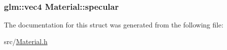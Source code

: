 \subsubsection[{\texorpdfstring{specular}{specular}}]{\setlength{\rightskip}{0pt plus 5cm}glm\+::vec4 Material\+::specular}\hypertarget{struct_material_ac891eeb20e11ff60f412484011d051b2}{}\label{struct_material_ac891eeb20e11ff60f412484011d051b2}


The documentation for this struct was generated from the following file\+:\begin{DoxyCompactItemize}
\item 
src/\hyperlink{_material_8h}{Material.\+h}\end{DoxyCompactItemize}
